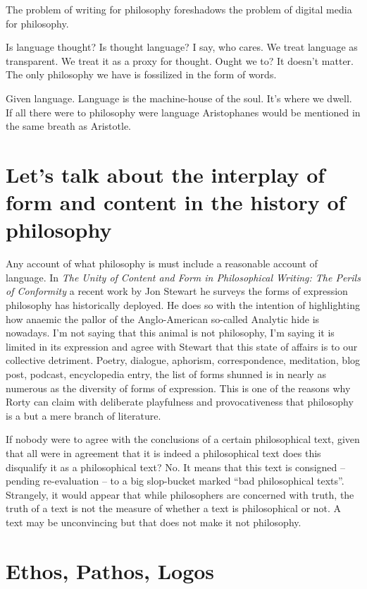 \documentclass[dah,phd,a4paper]{xe_uccthesis}
\newcommand{\work}[1] {\textit{#1}}
\begin{document}
The problem of writing\citep{plato_phaedrus_2006} for philosophy foreshadows the problem of digital media\citep{manovich_language_2002} for philosophy.

Is language thought? Is thought language? I say, who cares. We treat language as transparent. We treat it as a proxy for thought. Ought we to? It doesn't matter. The only philosophy we have is fossilized in the form of words.

Given language. Language is the machine-house of the soul. It's where we dwell. If all there were to philosophy were language Aristophanes would be mentioned in the same breath as Aristotle.

\section{Let's talk about the interplay of form and content in the history of philosophy}

Any account of what philosophy is must include a reasonable account of language. In \work{The Unity of Content and Form in Philosophical Writing: The Perils of Conformity}\citep{stewart_unity_2013} a recent work by Jon Stewart he surveys the forms of expression philosophy has historically deployed. He does so with the intention of highlighting how anaemic the pallor of the Anglo-American so-called Analytic hide is nowadays. I'm not saying that this animal is not philosophy, I'm saying it is limited in its expression and agree with Stewart that this state of affairs is to our collective detriment. Poetry, dialogue, aphorism, correspondence, meditation, blog post, podcast, encyclopedia entry, the list of forms shunned is in nearly as numerous as the diversity of forms of expression. This is one of the reasons why Rorty can claim with deliberate playfulness and provocativeness that philosophy is a but a mere branch of literature.

If nobody were to agree with the conclusions of a certain philosophical text, given that all were in agreement that it is indeed a philosophical text does this disqualify it as a philosophical text? No. It means that this text is consigned – pending re-evaluation – to a big slop-bucket marked “bad philosophical texts”. Strangely, it would appear that while philosophers are concerned with truth, the truth of a text is not the measure of whether a text is philosophical or not. A text may be unconvincing but that does not make it not philosophy.

\section{Ethos, Pathos, Logos}
\end{document}
